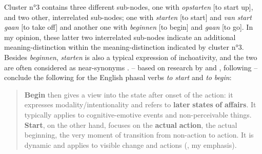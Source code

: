 Cluster n°3 contains three different sub-nodes, one with \textit{opstarten} [to start up], and two other, interrelated sub-nodes; one with \textit{starten} [to start] and \textit{van} \textit{start} \textit{gaan} [to take off] and another one with \textit{beginnen} [to begin] and \textit{gaan} [to go]. In my opinion, these latter two interrelated sub-nodes indicate an additional meaning-distinction within the meaning-distinction indicated by cluster n°3. Besides \textit{beginnen}, \textit{starten} is also a typical expression of inchoativity, and the two are often considered as near-synonyms \citep[223]{schmid_introspection_1996}. \citet{lewandowska-tomasczyk_corpus-based_2009} – based on research by \citet{biber_longman_1999} and \citet{schmid_cottage_1993}, following \citet{quirk_comprehensive_1985} – conclude the following for the English phasal verbs \textit{to} \textit{start} and \textit{to} \textit{begin}:

\begin{quote}
\textbf{Begin} then gives a view into the state after onset of the action: it expresses modality\slash intentionality and refers to \textbf{later} \textbf{states} \textbf{of} \textbf{affairs}. It typically applies to cognitive-emotive events and non-perceivable things. \textbf{Start}, on the other hand, focuses on the \textbf{actual} \textbf{action}, the actual beginning, the very moment of transition from non-action to action. It is dynamic and applies to visible change and actions (\citealt[279]{lewandowska-tomasczyk_corpus-based_2009}, my emphasis).
\end{quote}


